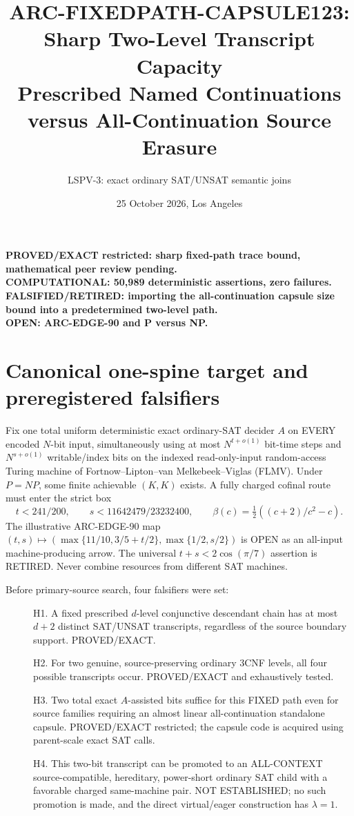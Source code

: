 \documentclass[11pt]{article}
\title{ARC-FIXEDPATH-CAPSULE123: Sharp Two-Level Transcript Capacity\\
\large Prescribed Named Continuations versus All-Continuation Source Erasure}
\author{LSPV-3: exact ordinary SAT/UNSAT semantic joins}
\date{25 October 2026, Los Angeles}
\begin{document}
\maketitle
\begin{center}
\textbf{PROVED/EXACT restricted: sharp fixed-path trace bound, mathematical peer review pending.}\\
\textbf{COMPUTATIONAL: 50,989 deterministic assertions, zero failures.}\\
\textbf{FALSIFIED/RETIRED: importing the all-continuation capsule size bound into a predetermined two-level path.}\\
\textbf{OPEN: ARC-EDGE-90 and P versus NP.}
\end{center}

\section{Canonical one-spine target and preregistered falsifiers}
Fix one total uniform deterministic exact ordinary-SAT decider $A$ on EVERY
encoded $N$-bit input, simultaneously using at most $N^{t+o(1)}$ bit-time
steps and $N^{s+o(1)}$ writable/index bits on the indexed read-only-input
random-access Turing machine of Fortnow--Lipton--van Melkebeek--Viglas
(FLMV). Under $P=NP$, some finite achievable $(K,K)$ exists. A fully
charged cofinal route must enter the strict box
\[
 t<241/200,\qquad s<11642479/23232400,
 \qquad \beta(c)=\tfrac12((c+2)/c^2-c).
\]
The illustrative ARC-EDGE-90 map
$(t,s)\mapsto(\max\{11/10,3/5+t/2\},\max\{1/2,s/2\})$
is OPEN as an all-input machine-producing arrow. The universal
$t+s<2\cos(\pi/7)$ assertion is RETIRED. Never combine resources
from different SAT machines.

Before primary-source search, four falsifiers were set:
\begin{description}
\item[] H1. A fixed prescribed $d$-level conjunctive descendant chain
has at most $d+2$ distinct SAT/UNSAT transcripts, regardless of the
source boundary support. PROVED/EXACT.
\item[] H2. For two genuine, source-preserving ordinary 3CNF levels,
all four possible transcripts occur. PROVED/EXACT and exhaustively tested.
\item[] H3. Two total exact $A$-assisted bits suffice for this FIXED
path even for source families requiring an almost linear all-continuation
standalone capsule. PROVED/EXACT restricted; the capsule code is acquired
using parent-scale exact SAT calls.
\item[] H4. This two-bit transcript can be promoted to an ALL-CONTEXT
source-compatible, hereditary, power-short ordinary SAT child with a
favorable charged same-machine pair. NOT ESTABLISHED; no such promotion
is made, and the direct virtual/eager construction has $\lambda=1$.
\end{description}
\end{document}
